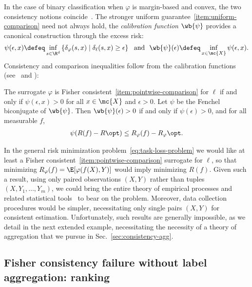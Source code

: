 \documentclass[11pt]{article}
\newcommand{\tloss}{\ell}  %
\newcommand{\sloss}{\varphi}  %
\newcommand{\extloss}{\delta_\tloss}
\newcommand{\exsloss}{\delta_\sloss}
\begin{document}
In the case of binary classification when $\sloss$ is margin-based and
convex, the two consistency notions coincide~\citep{BartlettJoMc06}.
%
The stronger uniform guarantee~\eqref{item:uniform-comparison} need not
always hold, the \emph{calibration function} $\wb{\psi}$ provides a
canonical construction through the excess risk:
\begin{align*}
  \psi(\epsilon, x)
  \defeq \inf_{s \in \R^d}
  \left\{\exsloss(s, x) \mid \extloss(s, x) \ge \epsilon\right\}
  ~~ \mbox{and} ~~
  \wb{\psi}(\epsilon)
  \defeq \inf_{x \in \mc{X}} \psi(\epsilon, x).
\end{align*}
Consistency and comparison inequalities follow
from the calibration functions (see~\citet[Prop.~25]{Zhang04a} and
\citet[Thm.~2.8 and Lemma~2.9]{Steinwart07}):
\begin{corollary}
  \label{cor:comparison-inequality-classical}
  The surrogate $\sloss$ is Fisher consistent~\eqref{item:pointwise-comparison}
  for $\tloss$ if and only if $\psi(\epsilon, x) > 0$ for all
  $x \in \mc{X}$ and $\epsilon > 0$.
  Let $\psi$ be the Fenchel biconjugate of $\wb{\psi}$.
  Then $\wb{\psi}(\epsilon) > 0$ if and only
  if $\psi(\epsilon) > 0$, and for all measurable $f$,
  \begin{align*}
    \psi(R(f) - R\opt) \leq R_\sloss(f)  - R_\sloss\opt.
  \end{align*}
\end{corollary}

In the general risk minimization problem~\eqref{eq:task-loss-problem} we
would like at least a Fisher consistent~\eqref{item:pointwise-comparison}
surrogate for $\tloss$, so that minimizing $R_\sloss(f) = \E[\sloss(f(X),
  Y)]$ would imply minimizing $R(f)$.
%
Given such a result, using only paired observations $(X, Y)$ rather than
tuples $(X, Y_1, \ldots, Y_m)$, we could bring the entire theory of
empirical processes and related statistical tools~\citep{VanDerVaartWe96,
  BartlettBoMe05, Koltchinskii06a, BartlettJoMc06} to bear on the problem.
%
Moreover, data collection procedures would be simpler, necessitating only
single pairs $(X, Y)$ for consistent estimation.
%
Unfortunately, such results are generally impossible, as we detail in the
next extended example, necessitating the necessity of a theory of
aggregation that we pursue in Sec.~\ref{sec:consistency-agg}.

\subsection{Fisher consistency failure without label aggregation: ranking}
\label{sec:counter-example}
\end{document}
